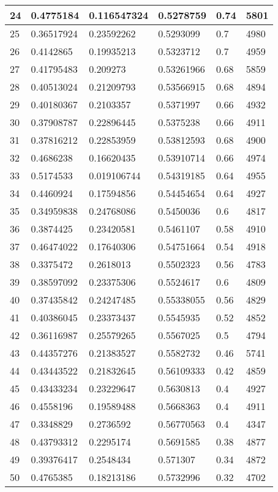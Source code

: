 \begin{longtable}{|l|l|l|l|l|l|}
24 & 0.4775184 & 0.116547324 & 0.5278759 & 0.74 & 5801 \\ \hline 
25 & 0.36517924 & 0.23592262 & 0.5293099 & 0.7 & 4980 \\ \hline 
26 & 0.4142865 & 0.19935213 & 0.5323712 & 0.7 & 4959 \\ \hline 
27 & 0.41795483 & 0.209273 & 0.53261966 & 0.68 & 5859 \\ \hline 
28 & 0.40513024 & 0.21209793 & 0.53566915 & 0.68 & 4894 \\ \hline 
29 & 0.40180367 & 0.2103357 & 0.5371997 & 0.66 & 4932 \\ \hline 
30 & 0.37908787 & 0.22896445 & 0.5375238 & 0.66 & 4911 \\ \hline 
31 & 0.37816212 & 0.22853959 & 0.53812593 & 0.68 & 4900 \\ \hline 
32 & 0.4686238 & 0.16620435 & 0.53910714 & 0.66 & 4974 \\ \hline 
33 & 0.5174533 & 0.019106744 & 0.54319185 & 0.64 & 4955 \\ \hline 
34 & 0.4460924 & 0.17594856 & 0.54454654 & 0.64 & 4927 \\ \hline 
35 & 0.34959838 & 0.24768086 & 0.5450036 & 0.6 & 4817 \\ \hline 
36 & 0.3874425 & 0.23420581 & 0.5461107 & 0.58 & 4910 \\ \hline 
37 & 0.46474022 & 0.17640306 & 0.54751664 & 0.54 & 4918 \\ \hline 
38 & 0.3375472 & 0.2618013 & 0.5502323 & 0.56 & 4783 \\ \hline 
39 & 0.38597092 & 0.23375306 & 0.5524617 & 0.6 & 4809 \\ \hline 
40 & 0.37435842 & 0.24247485 & 0.55338055 & 0.56 & 4829 \\ \hline 
41 & 0.40386045 & 0.23373437 & 0.5545935 & 0.52 & 4852 \\ \hline 
42 & 0.36116987 & 0.25579265 & 0.5567025 & 0.5 & 4794 \\ \hline 
43 & 0.44357276 & 0.21383527 & 0.5582732 & 0.46 & 5741 \\ \hline 
44 & 0.43443522 & 0.21832645 & 0.56109333 & 0.42 & 4859 \\ \hline 
45 & 0.43433234 & 0.23229647 & 0.5630813 & 0.4 & 4927 \\ \hline 
46 & 0.4558196 & 0.19589488 & 0.5668363 & 0.4 & 4911 \\ \hline 
47 & 0.3348829 & 0.2736592 & 0.56770563 & 0.4 & 4347 \\ \hline 
48 & 0.43793312 & 0.2295174 & 0.5691585 & 0.38 & 4877 \\ \hline 
49 & 0.39376417 & 0.2548434 & 0.571307 & 0.34 & 4872 \\ \hline 
50 & 0.4765385 & 0.18213186 & 0.5732996 & 0.32 & 4702 \\ \hline 
\end{longtable}
